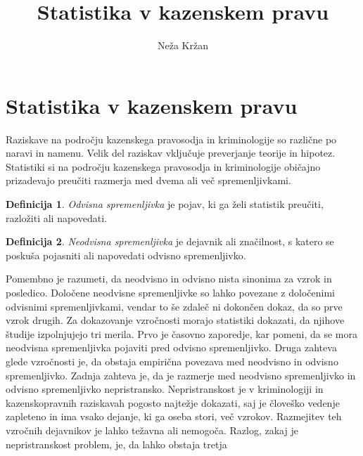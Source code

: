 \documentclass[12pt,a4paper]{amsart}
\theoremstyle{definition} %
\newtheorem{definicija}{Definicija}[section]
\theoremstyle{plain} %
\begin{document}
\title{Statistika v kazenskem pravu}
\author{Neža Kržan}
\maketitle

\section{Statistika v kazenskem pravu}
Raziskave na področju kazenskega pravosodja in kriminologije so različne po naravi in namenu. Velik del raziskav vključuje preverjanje teorije 
in hipotez. Statistiki si na področju kazenskega pravosodja in kriminologije običajno prizadevajo preučiti razmerja med dvema ali več spremenljivkami.
\begin{definicija}
    \textit{Odvisna spremenljivka} je pojav, ki ga želi statistik preučiti, razložiti ali napovedati.
\end{definicija}
\begin{definicija}
    \textit{Neodvisna spremenljivka} je dejavnik ali značilnost, s katero se poskuša pojasniti ali napovedati odvisno spremenljivko.
\end{definicija}
Pomembno je razumeti, da neodvisno in odvisno nista sinonima za vzrok in posledico. Določene neodvisne spremenljivke so lahko povezane z
določenimi odvisnimi spremenljivkami, vendar to še zdaleč ni dokončen dokaz, da so prve vzrok drugih. Za dokazovanje vzročnosti morajo
statistiki dokazati, da njihove študije izpolnjujejo tri merila. Prvo je časovno zaporedje, kar pomeni, da se mora neodvisna spremenljivka
pojaviti pred odvisno spremenljivko. Druga zahteva glede vzročnosti je, da obstaja empirična povezava med neodvisno in odvisno spremenljivko.
Zadnja zahteva je, da je razmerje med neodvisno spremenljivko in odvisno spremenljivko nepristransko. Nepristranskost je v kriminologiji in
kazenskopravnih raziskavah pogosto najtežje dokazati, saj je človeško vedenje zapleteno in ima vsako dejanje, ki ga oseba stori, več vzrokov.
Razmejitev teh vzročnih dejavnikov je lahko težavna ali nemogoča. Razlog, zakaj je nepristranskost problem, je, da lahko obstaja tretja
\end{document}
